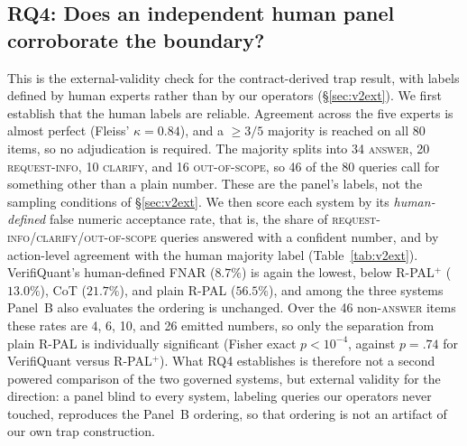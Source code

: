 \documentclass[sigconf,anonymous]{acmart}
\begin{document}
\subsection{RQ4: Does an independent human panel corroborate the boundary?}\label{sec:v2rq4}
This is the external-validity check for the contract-derived trap result, with labels defined by human experts rather than by our operators (\S\ref{sec:v2ext}).
We first establish that the human labels are reliable. Agreement across the five experts is almost perfect (Fleiss' $\kappa = 0.84$), and a $\ge 3/5$ majority is reached on all 80 items, so no adjudication is required. The majority splits into 34 \textsc{answer}, 20 \textsc{request-info}, 10 \textsc{clarify}, and 16 \textsc{out-of-scope}, so 46 of the 80 queries call for something other than a plain number. These are the panel's labels, not the sampling conditions of \S\ref{sec:v2ext}. We then score each system by its \emph{human-defined} false numeric acceptance rate, that is, the share of \textsc{request-info}/\textsc{clarify}/\textsc{out-of-scope} queries answered with a confident number, and by action-level agreement with the human majority label (Table~\ref{tab:v2ext}).
VerifiQuant's human-defined FNAR ($8.7\%$) is again the lowest, below R-PAL$^{+}$ ($13.0\%$), CoT ($21.7\%$), and plain R-PAL ($56.5\%$), and among the three systems Panel~B also evaluates the ordering is unchanged. Over the 46 non-\textsc{answer} items these rates are 4, 6, 10, and 26 emitted numbers, so only the separation from plain R-PAL is individually significant (Fisher exact $p<10^{-4}$, against $p{=}.74$ for VerifiQuant versus R-PAL$^{+}$). What RQ4 establishes is therefore not a second powered comparison of the two governed systems, but external validity for the direction: a panel blind to every system, labeling queries our operators never touched, reproduces the Panel~B ordering, so that ordering is not an artifact of our own trap construction.
\end{document}
